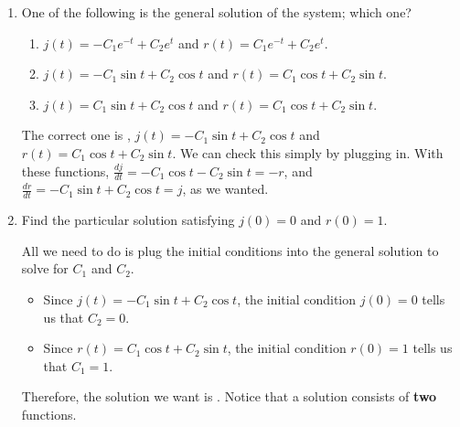 \documentclass[main]{subfiles}
\begin{document}
\begin{enumerate}
\begin{enumerate}
  \begin{solution}
  In the model, $\frac{dj}{dt} = -r$, so when Romeo loves Juliet ($r >
  0$), her feelings for him decrease.  Thus, the first statement is
  not correct.

  When Juliet loves Romeo ($j > 0$), $\frac{dr}{dt} =j$ is also
  positive, so Romeo's feelings for Juliet increase.  Thus, the second
  statement is true.

  The third statement is also true: $\frac{dj}{dt} = -r$, so
  $\frac{dj}{dt}$ is positive when $r$ is negative, and vice versa. 
  \end{solution}

  \item
  \begin{problem}[0.5in]
  One of the following is the general solution of the system; which
  one?
  \begin{enumerate}[itemsep=0.4in]
    \item $j(t) = - C_1 e^{-t} + C_2 e^t$ and $r(t) = C_1 e^{-t} + C_2
    e^t$.
    \item $j(t) = -C_1 \sin t + C_2 \cos t$ and $r(t) = C_1 \cos t + C_2
    \sin t$.
    \item $j(t) = C_1 \sin t + C_2 \cos t$ and $r(t) = C_1 \cos t + C_2
    \sin t$.
  \end{enumerate}
  \end{problem}

  \begin{solution}
  The correct one is , $j(t) = -C_1 \sin t + C_2 \cos t$ and
  $r(t) = C_1 \cos t + C_2 \sin t$.  We can check this simply by
  plugging in.  With these functions, $\frac{dj}{dt} = - C_1 \cos t -
  C_2 \sin t = - r$, and $\frac{dr}{dt} = - C_1 \sin t + C_2 \cos t =
  j$, as we wanted.
  \end{solution}

  \item

  \begin{problem}[3in]
  Find the particular solution satisfying $j(0) = 0$ and $r(0) = 1$.
  \end{problem}

  \begin{solution}
  All we need to do is plug the initial conditions into the general
  solution to solve for $C_1$ and $C_2$.
  \begin{itemize}
    \item Since $j(t) = -C_1 \sin t + C_2 \cos t$, the initial condition
    $j(0) = 0$ tells us that $C_2 = 0$.
    \item Since $r(t) = C_1 \cos t + C_2 \sin t$, the initial condition
    $r(0) = 1$ tells us that $C_1 = 1$.
  \end{itemize}
  Therefore, the solution we want is .  Notice that a solution consists of \textbf{two}
  functions.
  \end{solution}


\end{enumerate}
\end{enumerate}
\end{document}
